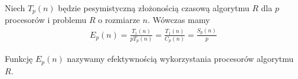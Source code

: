 \begin{definicja}
Niech \(T_{p}(n)\) będzie pesymistyczną złożonością czasową algorytmu \(R\) dla \(p\) procesorów i problemu \(R\) o rozmiarze \(n\). Wówczas mamy
\begin{equation}
\begin{split}
E_{p}(n)  = \frac{T_{1}(n)}{p T_{p}(n)}
	      = \frac{T_{1}(n)}{C_{p}(n)}
          = \frac{S_{p}(n)}{p}
\end{split}
\end{equation}

Funkcję \(E_{p}(n)\) nazywamy efektywnością wykorzystania procesorów algorytmu \(R\).
\end{definicja}

